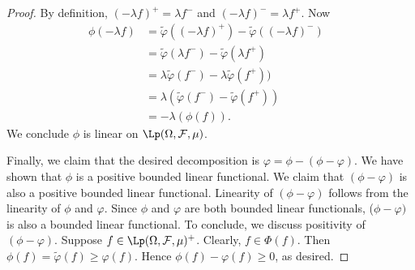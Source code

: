 \begin{proof}
By definition, $(-\lambda f)^+ = \lambda f^-$ and $(-\lambda f)^- = \lambda f^+$. Now
\begin{align*}
    \phi (- \lambda f) &= \widetilde{\varphi}((-\lambda f)^+) - \widetilde{\varphi}((-\lambda f)^-) & \\
                     &= \widetilde{\varphi}(\lambda f^-) - \widetilde{\varphi}(\lambda f^+) & \\
                     &= \lambda \widetilde{\varphi}(f^-) - \lambda \widetilde{\varphi}(f^+)) & \\
                     &= \lambda \left ( \widetilde{\varphi}(f^-) - \widetilde{\varphi}(f^+) \right ) & \\
                     &= -\lambda \left ( \phi(f) \right ).
\end{align*}
We conclude $\phi$ is linear on $\Lp(\Omega, \mathcal{F}, \mu)$.

Finally, we claim that the desired decomposition is $\varphi = \phi - (\phi - \varphi)$. We have shown that $\phi$ is a positive bounded linear functional. We claim that $(\phi - \varphi)$ is also a positive bounded linear functional. Linearity of $(\phi - \varphi)$ follows from the linearity of $\phi$ and $\varphi$. Since $\phi$ and $\varphi$ are both bounded linear functionals,  ($\phi - \varphi)$ is also a bounded linear functional. To conclude, we discuss positivity of $(\phi - \varphi)$. Suppose $f \in \Lp(\Omega, \mathcal{F}, \mu)^+$. Clearly, $f \in \Phi(f)$. Then $\phi(f) = \widetilde{\varphi}(f) \geq \varphi(f)$. Hence $\phi(f) - \varphi(f) \geq 0$, as desired.
\end{proof}